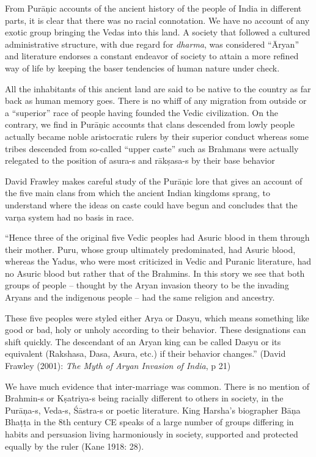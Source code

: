 From Purāņic accounts of the ancient history of the people of India in different parts, it is clear that there was no racial connotation. We have no account of any exotic group bringing the Vedas into this land. A society that followed a cultured administrative structure, with due regard for \textit{dharma}, was considered “Āryan” and literature endorses a constant endeavor of society to attain a more refined way of life by keeping the baser tendencies of human nature under check.

All the inhabitants of this ancient land are said to be native to the country as far back as human memory goes. There is no whiff of any migration from outside or a “superior” race of people having founded the Vedic civilization. On the contrary, we find in Purāņic accounts that clans descended from lowly people actually became noble aristocratic rulers by their superior conduct whereas some tribes descended from so-called “upper caste” such as Brahmans were actually relegated to the position of asura-s and rākṣasa-s by their base behavior

David Frawley makes careful study of the Purāņic lore that gives an account of the five main clans from which the ancient Indian kingdoms sprang, to understand where the ideas on caste could have begun and concludes that the varņa system had no basis in race.

\begin{myquote}
“Hence three of the original five Vedic peoples had Asuric blood in them through their mother. Puru, whose group ultimately predominated, had Asuric blood, whereas the Yadus, who were most criticized in Vedic and Puranic literature, had no Asuric blood but rather that of the Brahmins. In this story we see that both groups of people – thought by the Aryan invasion theory to be the invading Aryans and the indigenous people – had the same religion and ancestry.
\end{myquote}

\begin{myquote}
These five peoples were styled either Arya or Dasyu, which means something like good or bad, holy or unholy according to their behavior. These designations can shift quickly. The descendant of an Aryan king can be called Dasyu or its equivalent (Rakshasa, Dasa, Asura, etc.) if their behavior changes.” (David Frawley (2001): \textit{The Myth of Aryan Invasion of India}, p 21)
\end{myquote}

We have much evidence that inter-marriage was common. There is no mention of Brahmin-s or Kṣatriya-s being racially different to others in society, in the Purāņa-s, Veda-s, Śāstra-s or poetic literature. King Harsha’s biographer Bāņa Bhaṭṭa in the 8th century CE speaks of a large number of groups differing in habits and persuasion living harmoniously in society, supported and protected equally by the ruler (Kane 1918: 28).

